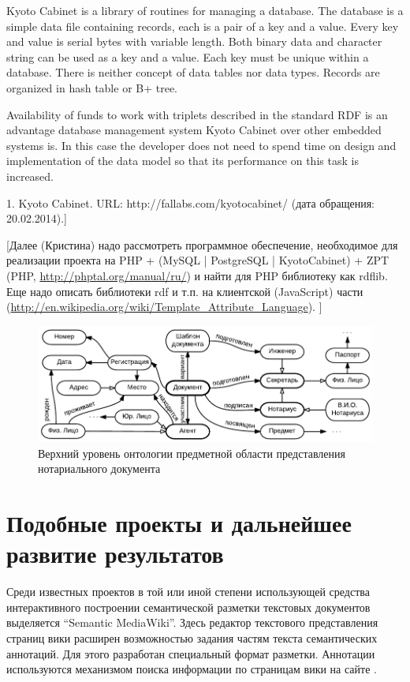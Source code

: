 \documentclass[utf8]{../IncArticle}
\newcommand{\e}[2][fcolor]{\textcolor{pcolor}{[}\textcolor{#1}{#2}\textcolor{pcolor}{]}}
\begin{document}
Kyoto Cabinet is a library of routines for managing a database.  The database is a simple data file containing records, each is a pair of a key and a value.  Every key and value is serial bytes with variable length.  Both binary data and character string can be used as a key and a value.  Each key must be unique within a database.  There is neither concept of data tables nor data types.  Records are organized in hash table or B+ tree.  \cite{b1}

Availability of funds to work with triplets described in the standard RDF is an advantage database management system Kyoto Cabinet over other embedded systems is.  In this case the developer does not need to spend time on design and implementation of the data model so that its performance on this task is increased.

1.	Kyoto Cabinet. URL: http://fallabs.com/kyotocabinet/ (дата обращения: 20.02.2014).]

\e{Далее (Кристина) надо рассмотреть программное обеспечение, необходимое для
  реализации проекта на PHP + (MySQL | PostgreSQL | KyotoCabinet) +
  ZPT (PHP, \url{http://phptal.org/manual/ru/}) и найти для PHP библиотеку как rdflib. Еще надо описать
  библиотеки rdf и т.п. на клиентской (JavaScript) части (\url{http://en.wikipedia.org/wiki/Template_Attribute_Language}). }

\begin{figure}[!t]
\centering
\includegraphics[width=0.8\linewidth]{DocumentOntology-ru.pdf}
\caption{Верхний уровень онтологии предметной области представления
  нотариального документа}
\label{notaryontology}
\end{figure}

\section{Подобные проекты и дальнейшее развитие результатов}

Среди известных проектов в той или иной степени использующей средства
интерактивного построении семантической разметки текстовых документов
выделяется “Semantic MediaWiki”.  Здесь редактор текстового
представления страниц вики расширен возможностью задания частям текста
семантических аннотаций.  Для этого разработан специальный формат
разметки.  Аннотации используются механизмом поиска информации по
страницам вики на сайте \cite{b1:13}.
\end{document}
